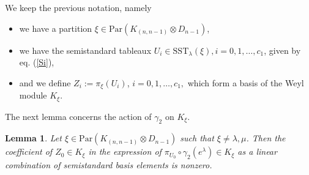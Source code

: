 \documentclass[11pt]{amsart}
\newtheorem{lem}[thm]{Lemma}
\theoremstyle{definition}
\numberwithin{equation}{section}
\begin{document}
We keep the previous notation, namely \begin{itemize}
	\item we have a partition $\xi  \in \mathrm{Par}(K_{(n,n-1)} \otimes  D_{n-1})$,
	\item we have the semistandard tableaux $U_i \in \mathrm{SST}_{\lambda} (\xi), i=0,1,\dots,c_1$, given by eq. (\ref{Si}),
	\item and we define $Z_i:=\pi_\xi(U_i)$, $i=0,1,\dots,c_1,$ which form a basis of the Weyl module $K_\xi$. 
\end{itemize}The next lemma concerns the action of $\gamma_2$ on $K_\xi$. \begin{lem}\label{lemma4} Let $\xi \in \mathrm{Par}(K_{(n,n-1)} \otimes  D_{n-1})$ such that $\xi \neq \lambda, \mu$. Then the coefficient of $Z_0 \in K_\xi$ in the expression of  $\pi_{U_0} \circ \gamma_2 (e^\lambda) \in K_\xi$ as a linear combination of semistandard basis elements is nonzero.
\end{lem}
\end{document}
